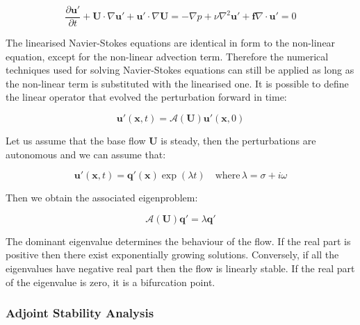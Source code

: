 \begin{subequations}
\begin{equation}
  \frac{\partial \mathbf{u'}}{\partial t} + \mathbf{U} \cdot  \nabla \mathbf{u'}+\mathbf{u'} \cdot \nabla \mathbf{U} = -\nabla p + \nu \nabla^2 \mathbf{u'} + \mathbf{f}
\end{equation}

\begin{equation}
    \nabla \cdot \mathbf{u'} = 0
\end{equation}

\end{subequations}



The linearised Navier-Stokes equations are identical in form to the non-linear equation, except for the non-linear advection term. Therefore the numerical techniques used for solving Navier-Stokes equations can still be applied as long as the non-linear term is substituted with the linearised one. It is possible to define the linear operator that evolved the perturbation forward in time:

\begin{equation}
   \mathbf{u'}(\mathbf{x},t)=\mathcal{A}(\mathbf{U})\mathbf{u'}(\mathbf{x},0)
\end{equation}

Let us assume that the base flow  $\mathbf{U}$ is steady, then the perturbations are autonomous and we can assume that:

\begin{equation}
   \mathbf{u'}(\mathbf{x},t)=\mathbf{q'}(\mathbf{x})\exp(\lambda t) \quad \mbox{where} \, \lambda=\sigma+i \omega
\end{equation}

Then we obtain the associated eigenproblem:

\begin{equation}
   \mathcal{A}(\mathbf{U})\mathbf{q'}=\lambda \mathbf{q'}
\end{equation}

The dominant eigenvalue determines the behaviour of the flow. If the real part
is positive then there exist exponentially growing solutions. Conversely, if all
the eigenvalues have negative real part then the flow is linearly stable. If the real part of the eigenvalue is zero, it is a bifurcation point.

\subsubsection{Adjoint Stability Analysis}

